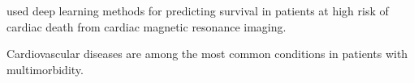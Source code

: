 

\textcite{popescuArrhythmic2022}
used deep learning methods for predicting
survival in patients at high risk of cardiac death
from cardiac magnetic resonance imaging.



Cardiovascular diseases are among the most common conditions in 
patients with multimorbidity.
~\autocite{dunlayMultimorbidity2016}
